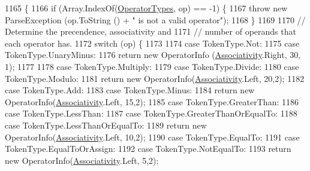 \begin{DoxyCode}
1165                                                                        \{
1166                 \textcolor{keywordflow}{if} (Array.IndexOf(\hyperlink{a00137_ad8a4bb1b46dbc3d1b7708e78a2d97e1c}{OperatorTypes}, op) == -1) \{
1167                     \textcolor{keywordflow}{throw} \textcolor{keyword}{new} ParseException (op.ToString () + \textcolor{stringliteral}{" is not a valid operator"});
1168                 \}
1169 
1170                 \textcolor{comment}{// Determine the precendence, associativity and}
1171                 \textcolor{comment}{// number of operands that each operator has.}
1172                 \textcolor{keywordflow}{switch} (op) \{
1173 
1174                 \textcolor{keywordflow}{case} TokenType.Not:
1175                 \textcolor{keywordflow}{case} TokenType.UnaryMinus:
1176                     \textcolor{keywordflow}{return} \textcolor{keyword}{new} OperatorInfo (\hyperlink{a00137_a83fa1b8db0e6678006920812b6f33f62}{Associativity}.Right, 30, 1);
1177 
1178                 \textcolor{keywordflow}{case} TokenType.Multiply:
1179                 \textcolor{keywordflow}{case} TokenType.Divide:
1180                 \textcolor{keywordflow}{case} TokenType.Modulo:
1181                     \textcolor{keywordflow}{return} \textcolor{keyword}{new} OperatorInfo(\hyperlink{a00137_a83fa1b8db0e6678006920812b6f33f62}{Associativity}.Left, 20,2);
1182                 \textcolor{keywordflow}{case} TokenType.Add:
1183                 \textcolor{keywordflow}{case} TokenType.Minus:
1184                     \textcolor{keywordflow}{return} \textcolor{keyword}{new} OperatorInfo(\hyperlink{a00137_a83fa1b8db0e6678006920812b6f33f62}{Associativity}.Left, 15,2);
1185                 \textcolor{keywordflow}{case} TokenType.GreaterThan:
1186                 \textcolor{keywordflow}{case} TokenType.LessThan:
1187                 \textcolor{keywordflow}{case} TokenType.GreaterThanOrEqualTo:
1188                 \textcolor{keywordflow}{case} TokenType.LessThanOrEqualTo:
1189                     \textcolor{keywordflow}{return} \textcolor{keyword}{new} OperatorInfo(\hyperlink{a00137_a83fa1b8db0e6678006920812b6f33f62}{Associativity}.Left, 10,2);
1190                 \textcolor{keywordflow}{case} TokenType.EqualTo:
1191                 \textcolor{keywordflow}{case} TokenType.EqualToOrAssign:
1192                 \textcolor{keywordflow}{case} TokenType.NotEqualTo:
1193                     \textcolor{keywordflow}{return} \textcolor{keyword}{new} OperatorInfo(\hyperlink{a00137_a83fa1b8db0e6678006920812b6f33f62}{Associativity}.Left, 5,2);

\end{DoxyCode}
